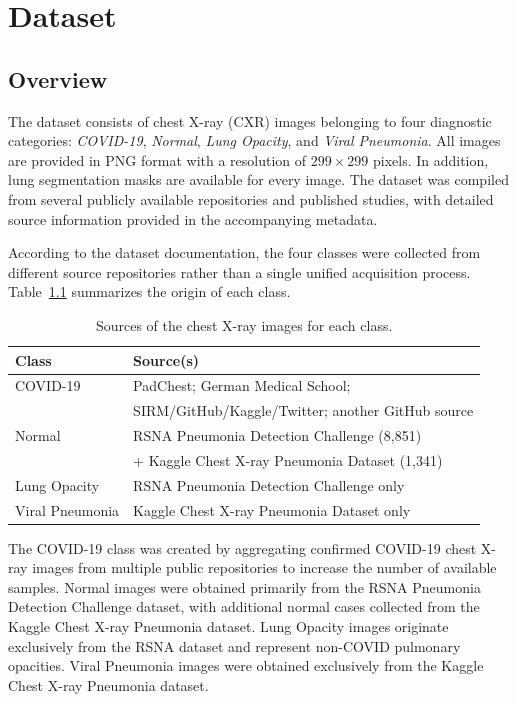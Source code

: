 \chapter{Dataset}
\label{chap:data}
\section{Overview}

The dataset consists of chest X-ray (CXR) images belonging to four diagnostic
categories: \textit{COVID-19}, \textit{Normal}, \textit{Lung Opacity}, and
\textit{Viral Pneumonia}. All images are provided in PNG format with a
resolution of $299 \times 299$ pixels. In addition, lung segmentation masks
are available for every image. The dataset was compiled from several publicly
available repositories and published studies, with detailed source information
provided in the accompanying metadata.

According to the dataset documentation, the four classes were collected from
different source repositories rather than a single unified acquisition process.
Table~\ref{tab:data_sources} summarizes the origin of each class.

\begin{table}[H]
\centering
\caption{Sources of the chest X-ray images for each class.}
\label{tab:data_sources}
\begin{tabular}{ll}
\toprule
\textbf{Class} & \textbf{Source(s)} \\
\midrule
COVID-19 &
PadChest; German Medical School;\\
& SIRM/GitHub/Kaggle/Twitter; another GitHub source \\
\addlinespace
Normal &
RSNA Pneumonia Detection Challenge (8,851)\\
& + Kaggle Chest X-ray Pneumonia Dataset (1,341) \\
\addlinespace
Lung Opacity &
RSNA Pneumonia Detection Challenge only \\
\addlinespace
Viral Pneumonia &
Kaggle Chest X-ray Pneumonia Dataset only \\
\bottomrule
\end{tabular}
\end{table}

The COVID-19 class was created by aggregating confirmed COVID-19 chest X-ray
images from multiple public repositories to increase the number of available
samples. Normal images were obtained primarily from the RSNA Pneumonia
Detection Challenge dataset, with additional normal cases collected from the
Kaggle Chest X-ray Pneumonia dataset. Lung Opacity images originate
exclusively from the RSNA dataset and represent non-COVID pulmonary
opacities. Viral Pneumonia images were obtained exclusively from the Kaggle
Chest X-ray Pneumonia dataset.

